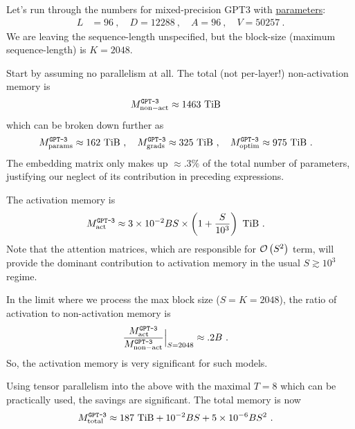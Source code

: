 \documentclass[11pt]{article}
\begin{document}
Let's run through the numbers for mixed-precision GPT3 with
\href{https://bmk.sh/2020/05/29/GPT-3-A-Brief-Summary/}{parameters}:
\begin{align}
L &= 96 \ , \quad
D = 12288 \ ,\quad
A = 96\ , \quad V = 50257\ .
 \label{eq_gpt_num}
\end{align}
We are leaving the sequence-length unspecified, but the block-size (maximum sequence-length) is $
K=2048 $.


Start by assuming no parallelism at all. The total (not per-layer!) non-activation memory is
\begin{align}
  M _{ {\rm non-act}  } ^ \texttt{GPT-3} & \approx 1463\ {\rm TiB}
\end{align}
which can be broken down further as
\begin{align}
  M _{ {\rm params}  } ^ \texttt{GPT-3} & \approx 162\ {\rm TiB} \ , \quad
 M _{ {\rm grads}  } ^ \texttt{GPT-3}  \approx 325\ {\rm TiB}\ , \quad
  M _{ {\rm optim}  } ^ \texttt{GPT-3}  \approx 975\ {\rm TiB}\ .
\end{align}
The embedding matrix only makes up $ \approx .3\% $ of the total number of parameters, justifying our
neglect of its contribution in preceding expressions.


The activation memory is
\begin{align}
  M _{ {\rm act}  } ^ \texttt{GPT-3} & \approx 3 \times 10 ^{ -2 }BS\times  \left (  1  + \frac{ S
  }{ 10 ^{ 3 } } \right ) \ {\rm TiB} \ .
\end{align}
Note that the attention matrices, which are responsible for $ \mathcal{O} \left( S ^{ 2 } \right)  $ term, will
provide the dominant contribution to activation memory in the usual $ S \gtrsim 10 ^{ 3 } $ regime.

In the limit where we process the max block size ($ S=K=2048 $), the ratio of activation to
non-activation memory is
\begin{align}
  \frac{  M _{ {\rm act}  } ^ \texttt{GPT-3}}{ M _{ {\rm non-act}  } ^ \texttt{GPT-3} }\Big| _{
  S=2048 } & \approx  .2 B \ .
\end{align}
So, the activation memory is very significant for such models.


Using tensor parallelism into the above with the maximal $ T=8 $ which can be practically used, the
savings are significant. The total memory is now
\begin{align}
  M _{ {\rm total}  } ^{ \texttt{GPT-3}  } & \approx 187\ {\rm TiB} + 10 ^{ -2 }BS + 5 \times 10 ^{
  -6} BS ^{ 2 }\ .
\end{align}
\end{document}

